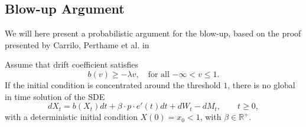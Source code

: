 \subsection{Blow-up Argument}
We will here present a probabilistic argument for the blow-up, based on the proof presented by Carrilo, Perthame et al. in \cite{caceres_analysis_2010}
\begin{theorem}
Assume that drift coefficient satisfies
\[b(v) \geq -\lambda v, \quad \text{for all $-\infty<v\leq1$.}\]
If the initial condition is concentrated around the threshold $1$, there is no global in time solution of the SDE
\[dX_t = b(X_t)dt + \beta\cdot p\cdot e'(t) dt + dW_t - d M_t, \qquad t\geq 0,\]
with a deterministic initial condition $X(0) = x_0 < 1$, with $\beta \in \mathbb{R}^+$.
\end{theorem}
